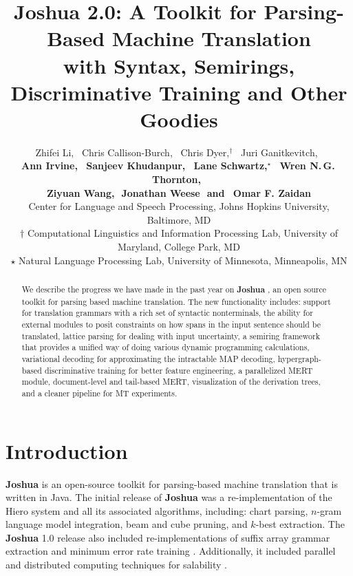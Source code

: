 \documentclass[11pt]{article}
\title{Joshua 2.0: A Toolkit for Parsing-Based Machine Translation \\with Syntax, Semirings, Discriminative Training and Other Goodies }
\author{
Zhifei Li,\,\,\,
Chris Callison-Burch,\,\,\,
Chris Dyer,$^\dagger$\,\,\,
Juri Ganitkevitch,\,\,\,
\\ {\bf
Ann Irvine,\,\,\,  
Sanjeev Khudanpur,\,\,\,
Lane Schwartz,$^\star$\,\,\, 
Wren N.\,G.\,Thornton,\,\,\,}
\\ {\bf
Ziyuan Wang,\,\,
Jonathan Weese\,\,
{\textnormal{and}}
\,\,\,Omar F. Zaidan
}\\
Center for Language and Speech Processing, Johns Hopkins University, Baltimore, MD\\
$\dagger$ Computational Linguistics and Information Processing Lab, University of Maryland, College Park, MD\\
$\star$ Natural Language Processing Lab, University of Minnesota, Minneapolis, MN }
\date{}
\newcommand{\joshua}{\textbf{Joshua}\xspace}
\begin{document}
\maketitle
\begin{abstract}
We describe the progress we have made in the past year on \textbf{Joshua} \cite{joshua-wmt09}, 
an open source toolkit for parsing based machine translation.
The new functionality includes: 
support for translation grammars with a rich set of syntactic nonterminals,
the ability for external modules to posit constraints on how spans in the input sentence should be translated,  
lattice parsing for dealing with input uncertainty,
a semiring framework that provides a unified way of doing various dynamic programming calculations, 
variational decoding for approximating the intractable MAP decoding,
hypergraph-based discriminative training for better feature engineering, 
a parallelized MERT module,
document-level and tail-based MERT,
visualization of the derivation trees, 
and a cleaner pipeline for MT experiments.
\end{abstract}



\section{Introduction}

\textbf{Joshua} is an open-source toolkit for parsing-based machine translation that is written in Java. The initial release of \joshua  \cite{joshua-wmt09} was a re-implementation of the Hiero system \cite{hiero-2007} and all its associated algorithms, including: chart parsing, $n$-gram language model integration, beam and cube pruning, and $k$-best extraction.  The \joshua 1.0 release also included re-implementations of suffix array grammar extraction \cite{lopez:2007:EMNLP-CoNLL2007,PBML-2010-Joshua-grammar-extraction}  and minimum error rate training \cite{och-mert,Zaidan2009}.  Additionally, it included parallel and distributed computing techniques for salability \cite{Joshua-old}. 
\end{document}
